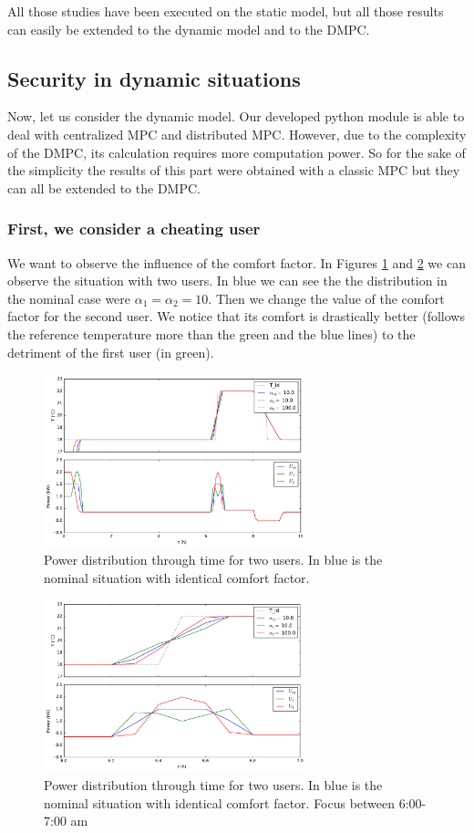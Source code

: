 \documentclass[conference]{IEEEtran}
\edef\hc{\string:}
\begin{document}
All those studies have been executed on the static model, but all those results can easily be extended to the dynamic model and to the DMPC. 

\subsection{Security in dynamic situations}
Now, let us consider the dynamic model. Our developed python module is able to deal with centralized MPC and distributed MPC. However, due to the complexity of the DMPC, its calculation requires more computation power. So for the sake of the simplicity the results of this part were obtained with a classic MPC but they can all be extended to the DMPC.  

\subsubsection{First, we consider a cheating user}
We want to observe the influence of the comfort factor. In Figures \ref{DMPCa_1} and \ref{DMPCa_2} we can observe the situation with two users. In blue we can see the the distribution in the nominal case were $\alpha_1=\alpha_2 = 10$. Then we change the value of the comfort factor for the second user. We notice that its comfort is drastically better (follows the reference temperature more than the green and the blue lines) to the detriment of the first user (in green).  

\begin{figure}[H]
\centering
\includegraphics[width=3in]{DMPCalp.pdf}
\caption{Power distribution through time for two users. In blue is the nominal situation with identical comfort factor.}
\label{DMPCa_1}
\end{figure}

\begin{figure}[H]
\centering
\includegraphics[width=3in]{DMPCalpZ.pdf}
\caption{Power distribution through time for two users. In blue is the nominal situation with identical comfort factor. Focus between 6\hc 00-7\hc 00 am}
\label{DMPCa_2}
\end{figure}
\end{document}
